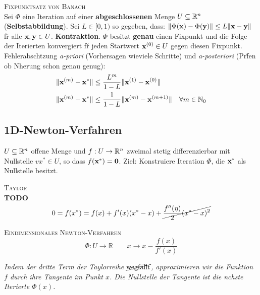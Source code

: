 \textsc{Fixpunktsatz von Banach}\\
Sei $\Phi$ eine Iteration auf einer \textbf{abgeschlossenen} Menge $U \subseteq \mathbb{R}^{n}$ (\textbf{Selbstabbildung}). Sei $L \in [0,1)$ so gegeben, dass: $\Vert \Phi(\mbox{\bf x}) - \Phi(\mbox{\bf y}) \Vert \leq L \Vert \mbox{\bf x} - \mbox{\bf y} \Vert$ f\u r alle $\mbox{\bf x},\mbox{\bf y} \in U$. \textbf{Kontraktion}. $\Phi$ besitzt \textbf{genau} einen Fixpunkt und die Folge der Iterierten konvergiert f\u r jeden Startwert $\mbox{\bf x}^{(0)} \in U$ gegen diesen Fixpunkt.\\
Fehlerabsch\a tzung \emph{a-priori} (Vorhersagen wieviele Schritte) und \emph{a-posteriori} (Pr\u fen ob N\a herung schon genau genug):
\begin{align*}
\Vert \mbox{\bf x}^{(m)} - \mbox{\bf x}^* \Vert &\leq \frac{L^m}{1-L} \Vert \mbox{\bf x}^{(1)} - \mbox{\bf x}^{(0)} \Vert \\
\Vert \mbox{\bf x}^{(m)} - \mbox{\bf x}^* \Vert &\leq \frac{1}{1-L} \Vert \mbox{\bf x}^{(m)} - \mbox{\bf x}^{(m+1)} \Vert \quad \forall m \in \mathbb{N}_0
\end{align*}

\subsection{1D-Newton-Verfahren}
$U \subseteq \mathbb{R}^{n}$ offene Menge und $f: U \rightarrow \mathbb{R}^{n}$ zweimal stetig differenzierbar mit Nullstelle $v{x}^*\in U$, so dass $f(\mbox{\bf x}^*)=\mbox{\bf 0}$. Ziel: Konstruiere Iteration $\Phi$, die $\mbox{\bf x}^*$ als Nullstelle besitzt.\vspace{0.2cm}

\textsc{Taylor} \\
\textbf{TODO}\\
\begin{equation*}
0 = f(x^*) = f(x) + f'(x)(x^* - x) + \cancel{\frac{f''(\eta)}{2}(x^*-x)^2}
\end{equation*}\vspace{0.2cm}

\textsc{Eindimensionales Newton-Verfahren}\\
\begin{equation*}
\Phi : U \rightarrow \mathbb{R} \qquad x \rightarrow x- \frac{f(x)}{f'(x)}
\end{equation*}

\emph{Indem der dritte Term der Taylorreihe $\cancel{\text{wegf\"{a}llt}}$, approximieren wir die Funktion $f$ durch ihre Tangente im Punkt $x$. Die Nullstelle der Tangente ist die n\a chste Iterierte $\Phi(x)$.}\vspace{0.2cm}

